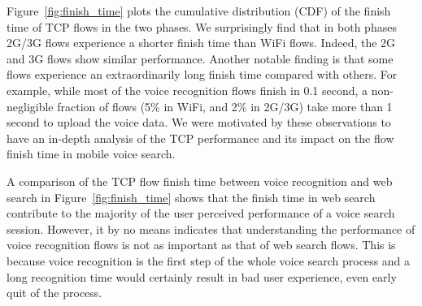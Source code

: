 Figure~\ref{fig:finish_time} plots the cumulative distribution (CDF) of the finish time of TCP flows in the two phases. We surprisingly find that in both phases 2G/3G flows experience a shorter finish time than WiFi flows. Indeed, the 2G and 3G flows show similar performance. Another notable finding is that some flows experience an extraordinarily long finish time compared with others. For example, while most of the voice recognition flows finish in 0.1 second, a non-negligible fraction of flows (5\% in WiFi, and 2\% in 2G/3G) take more than 1 second to upload the voice data. We were motivated by these observations to have an in-depth analysis of the TCP performance and its impact on the flow finish time in mobile voice search.



A comparison of the TCP flow finish time between voice recognition and web search in Figure~\ref{fig:finish_time} shows that the finish time in web search contribute to the majority of the user perceived performance of a voice search session. However, it by no means indicates that understanding the performance of voice recognition flows is not as important as that of web search flows. This is because voice recognition is the first step of the whole voice search process and a long recognition time would certainly result in bad user experience, even early quit of the process.


